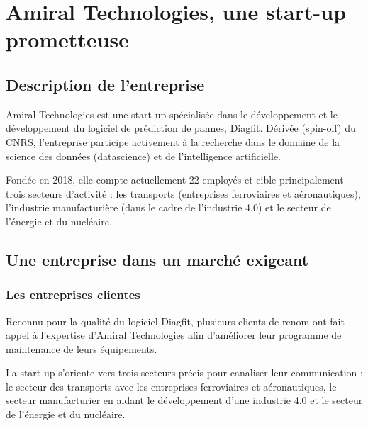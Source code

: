 \section{Amiral Technologies, une start-up prometteuse}
\subsection{Description de l'entreprise}
Amiral Technologies est une start-up spécialisée dans le développement et le développement du logiciel de prédiction de pannes, Diagfit.
Dérivée (spin-off) du CNRS, l'entreprise participe activement à la recherche dans le domaine de la science des données (datascience) et de l'intelligence artificielle.

Fondée en 2018, elle compte actuellement 22 employés et cible principalement trois secteurs d'activité : les transports (entreprises ferroviaires et aéronautiques), l'industrie manufacturière (dans le cadre de l'industrie 4.0) et le secteur de l'énergie et du nucléaire.

\subsection{Une entreprise dans un marché exigeant}
\subsubsection{Les entreprises clientes}
Reconnu pour la qualité du logiciel Diagfit, plusieurs clients de renom ont fait appel à l’expertise d’Amiral Technologies afin d'améliorer leur programme de maintenance de leurs équipements.

La start-up s'oriente vers trois secteurs précis pour canaliser leur communication : le secteur des transports avec les entreprises ferroviaires et aéronautiques, le secteur manufacturier en aidant le développement d'une industrie 4.0 et le secteur de l'énergie et du nucléaire.

